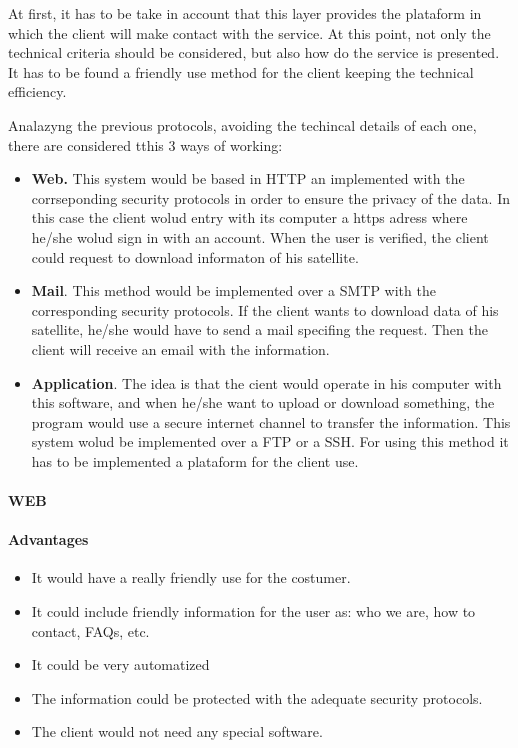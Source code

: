 At first, it has to be take in account that this layer provides the plataform in which the client will make contact with the service. At this point, not only the technical criteria should be considered, but also how do the service is presented. It has to be found a friendly use method for the client keeping the technical efficiency.

Analazyng the previous protocols, avoiding the techincal details of each one, there are considered tthis 3 ways of working:
\begin{itemize}
\item \textbf{Web.} This system would be based in HTTP an implemented with the corrseponding security protocols in order to ensure the privacy of the data. In this case the client wolud entry with its computer a https adress where he/she wolud sign in with an account. When the user is verified, the client could request to download informaton of his satellite. 
\item \textbf{Mail}. This method would be implemented over a SMTP with the corresponding security protocols. If the client wants to download data of his satellite, he/she would have to send a mail specifing the request. Then the client will receive an email with the information.
\item \textbf{Application}.  The idea is that the cient would operate in his computer with this software, and when he/she want to upload or download something, the program would use a secure internet channel to transfer the information. This system wolud be implemented over a FTP or a SSH. For using this method it has to be implemented a plataform for the client use.
\end{itemize}

\paragraph{WEB}
\paragraph{Advantages}
\begin{itemize}
\item It would have a really friendly use for the costumer. 
\item It could include friendly information for the user as: who we are, how to contact, FAQs, etc.
\item It could be very automatized
\item The information could be protected with the adequate security protocols.
\item The client would not need any special software.
\end{itemize}
